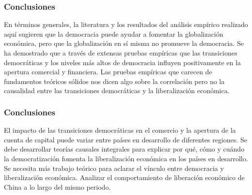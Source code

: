 \documentclass{beamer}
\begin{document}
\begin{frame}
\frametitle{Conclusiones}
En términos generales, la literatura y los resultados del análisis empírico realizado aquí sugieren que la democracia puede ayudar a fomentar la globalización económica, pero que la globalización en sí misma no promueve la democracia. 
Se ha demostrado que a través de extensas pruebas empíricas que las transiciones democráticas y los niveles más altos de democracia influyen positivamente en la apertura comercial y financiera.
Las pruebas empíricas que carecen de fundamentos teóricos sólidos nos dicen algo sobre la correlación pero no la causalidad entre las transiciones democráticas y la liberalización económica. 

\end{frame}

\begin{frame}
\frametitle{Conclusiones}
El impacto de las transiciones democráticas en el comercio y la apertura de la cuenta de capital puede variar entre países en desarrollo de diferentes regiones.
Se debe desarrollar teorías causales integrales para explicar por qué, cómo y cuándo la democratización fomenta la liberalización económica en los países en desarrollo.
Se necesita más trabajo teórico para aclarar el vínculo entre democracia y liberalización económica.
Analizar el comportamiento de liberación económico de China a lo largo del mismo periodo. 


\end{frame}
\end{document}
